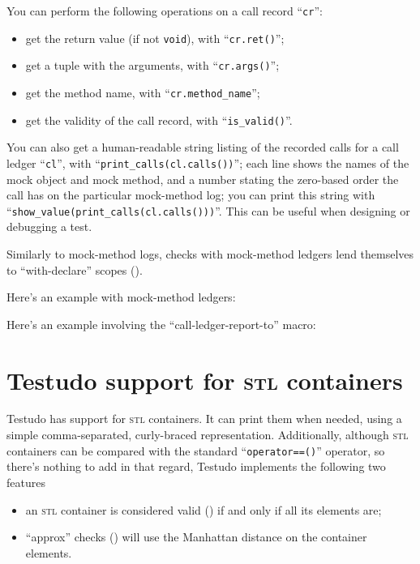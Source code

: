 \documentclass[twoside, a4paper, article]{memoir}
\newcommand\typesetexample[1]{%
  \typesetexamplesource{#1}
}
\providecommand\typesetexamplesource[1]{%
}
\begin{document}
You can perform the following operations on a call record ``\texttt{cr}'':
\begin{itemize}
\item get the return value (if not \texttt{void}), with ``\texttt{cr.ret()}'';
\item get a tuple with the arguments, with ``\texttt{cr.args()}'';
\item get the method name, with ``\texttt{cr.method\_name}'';
\item get the validity of the call record, with ``\texttt{is\_valid()}''.
\end{itemize}

You can also get a human-readable string listing of the recorded calls for a
call ledger ``\texttt{cl}'', with ``\texttt{print\_calls(cl.calls())}''; each
line shows the names of the mock object and mock method, and a number stating
the zero-based order the call has on the particular mock-method log; you can
print this string with ``\texttt{show\_value(print\_calls(cl.calls()))}''.
This can be useful when designing or debugging a test.

Similarly to mock-method logs, checks with mock-method ledgers lend themselves
to ``with-declare'' scopes ().

Here's an example with mock-method ledgers:

\typesetexample{ledger-with-declare}

Here's an example involving the ``call-ledger-report-to'' macro:

\typesetexample{ledger-call-ledger-report-to}


\chapter{Testudo support for \textsc{stl} containers}
\label{cha:testudo-support-stl-types}

Testudo has support for \textsc{stl} containers. It can print them when needed,
using a simple comma-separated, curly-braced representation.  Additionally,
although \textsc{stl} containers can be compared with the standard
``\texttt{operator==()}'' operator, so there's nothing to add in that regard,
Testudo implements the following two features
\begin{itemize}
\item an \textsc{stl} container is considered valid
  () if and only if all its elements are;
\item ``approx'' checks () will use
  the Manhattan distance on the container elements.
\end{itemize}
\end{document}
